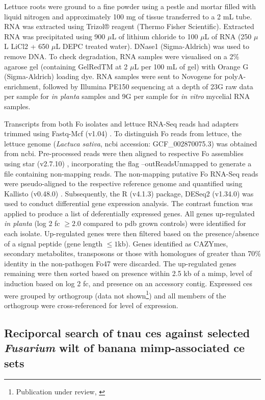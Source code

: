 Lettuce roots were ground to a fine powder using a pestle and mortar filled with liquid nitrogen and approximately 100 mg of tissue transferred to a 2 mL tube. RNA was extracted using Trizol® reagent (Thermo Fisher Scientific). Extracted RNA was precipitated using 900 \(\mu\)L of lithium chloride to 100 \(\mu\)L of RNA (250 \(\mu\)L LiCl2 + 650 \(\mu\)L DEPC treated water). DNase1 (Sigma-Aldrich) was used to remove DNA. To check degradation, RNA samples were visualised on a 2\% agarose gel (containing GelRedTM at 2 \(\mu\)L per 100 mL of gel) with Orange G (Sigma-Aldrich) loading dye. RNA samples were sent to  Novogene for polyA-enrichment, followed by Illumina PE150 sequencing at a depth of 23G raw data per sample for \textit{in planta} samples and 9G per sample for \textit{in vitro} mycelial RNA samples.

Transcripts from both \ac{Fo} isolates and lettuce RNA-Seq reads had adapters trimmed using Fastq-Mcf (v1.04) \parencite{Aronesty2013}. To distinguish \ac{Fo} reads from lettuce, the lettuce genome (\textit{Lactuca sativa}, \ac{ncbi} accession: GCF\_002870075.3) was obtained from \ac{ncbi}. Pre-processed reads were then aligned to respective \ac{Fo} assemblies using \ac{star} (v2.7.10) \parencite{Dobin2013}, incorporating the flag --outReadsUnmapped to generate a file containing non-mapping reads. The non-mapping putative \ac{Fo} RNA-Seq reads were pseudo-aligned to the respective reference genome and quantified using Kallisto (v0.48.0) \parencite{Bray2016}. Subsequently, the R (v4.1.3) \parencite{R} package, DESeq2 (v1.34.0) \parencite{Love2014} was used to conduct differential gene expression analysis. The contrast function was applied to produce a list of deferentially expressed genes. All genes up-regulated \textit{in planta} (log 2 \ac{fc} $\ge2.0$ compared to \ac{pdb} grown controls) were identified for each isolate. Up-regulated genes were then filtered based on the presence/absence of a signal peptide (gene length $\le1$kb). Genes identified as CAZYmes, secondary metabolites, transposons or those with homologues of greater than 70\% identity in the non-pathogen Fo47 were discarded. The up-regulated genes remaining were then sorted based on presence within 2.5 kb of a \ac{mimp}, level of induction based on log 2 \ac{fc}, and presence on an accessory contig. Expressed \acp{ce} were grouped by orthogroup (data not shown\footnote{Publication under review, \textcite{FolaManuscript}}) and all members of the orthogroup were cross-referenced for level of expression. 

\subsection{Reciporcal search of \ac{tnau} \aclp{ce} against selected \textit{Fusarium} wilt of banana \ac{mimp}-associated \ac{ce} sets}

